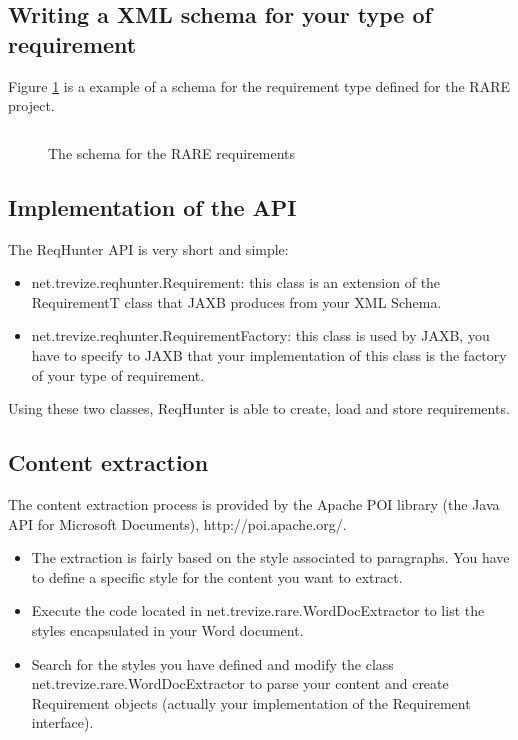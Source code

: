 \documentclass{llncs}
\begin{document}
\subsection{Writing a XML schema for your type of requirement}

Figure \ref{table:schema_req} is a example of a schema for the requirement type defined for the RARE project.

\begin{figure}[H]
	\centering
	\begin{tabular}{ | p{\linewidth} | }
	\hline
	 \\
	\hline
	\end{tabular}
	\caption{The schema for the RARE requirements}
	\label{table:schema_req}
\end{figure}

\subsection{Implementation of the API}

The ReqHunter API is very short and simple:
\begin{itemize}
  \item net.trevize.reqhunter.Requirement: this class is an extension of the RequirementT class that JAXB produces from your XML Schema.
  \item net.trevize.reqhunter.RequirementFactory: this class is used by JAXB, you have to specify to JAXB that your implementation of this class is the factory of your type of requirement.
\end{itemize}

Using these two classes, ReqHunter is able to create, load and store requirements.

\subsection{Content extraction}

The content extraction process is provided by the Apache POI library (the Java API for Microsoft Documents), http://poi.apache.org/.

\begin{itemize}
  \item The extraction is fairly based on the style associated to paragraphs. You have to define a specific style for the content you want to extract.
  \item Execute the code located in net.trevize.rare.WordDocExtractor to list the styles encapsulated in your Word document.
  \item Search for the styles you have defined and modify the class net.trevize.rare.WordDocExtractor to parse your content and create Requirement objects (actually your implementation of the Requirement interface).
\end{itemize}
\end{document}
